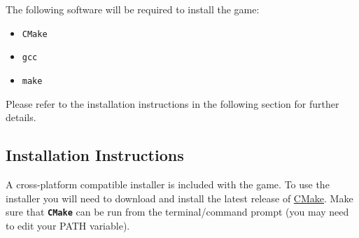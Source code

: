 \documentclass[12pt, titlepage]{article}
\begin{document}
\noindent The following software will be required to install the game:
\begin{itemize}
  \item \texttt{CMake}
  \item \texttt{gcc}
  \item \texttt{make}
\end{itemize}

\noindent Please refer to the installation instructions in the following section for further details.

\subsection{Installation Instructions}
A cross-platform compatible installer is included with the game.  To use the installer you will need to download and install the latest release of \href{https://cmake.org/}{CMake}.  Make sure that \texttt{\bf CMake} can be run from the terminal/command prompt (you may need to edit your PATH variable).
\end{document}

